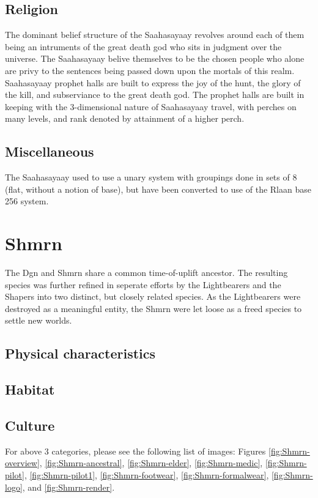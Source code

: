 \subsection{Religion}
The dominant belief structure of the Saahasayaay revolves around each
of them being an intruments of the great death god who sits in
judgment over the universe. The Saahasayaay belive themselves to be
the chosen people who alone are privy to the sentences being passed
down upon the mortals of this realm. Saahasayaay prophet halls are
built to express the joy of the hunt, the glory of the kill, and
subserviance to the great death god. The prophet halls are built in
keeping with the 3-dimensional nature of Saahasayaay travel, with
perches on many levels, and rank denoted by attainment of a higher
perch.

\subsection{Miscellaneous}
The Saahasayaay used to use a unary system with groupings done in sets
of 8 (flat, without a notion of base), but have been converted to use
of the Rlaan base 256 system.

\section{Shmrn}
\label{subsec:Shmrn-species}
The Dgn and Shmrn share a common time-of-uplift ancestor. The
resulting species was further refined in seperate efforts by the
Lightbearers and the Shapers into two distinct, but closely related
species. As the Lightbearers were destroyed as a meaningful entity,
the Shmrn were let loose as a freed species to settle new worlds.

\subsection{Physical characteristics}

\subsection{Habitat}

\subsection{Culture}

For above 3 categories, please see the following list of images: Figures \ref{fig:Shmrn-overview}, \ref{fig:Shmrn-ancestral}, \ref{fig:Shmrn-elder}, \ref{fig:Shmrn-medic}, \ref{fig:Shmrn-pilot}, \ref{fig:Shmrn-pilot1}, \ref{fig:Shmrn-footwear}, \ref{fig:Shmrn-formalwear}, \ref{fig:Shmrn-logo}, and \ref{fig:Shmrn-render}.

